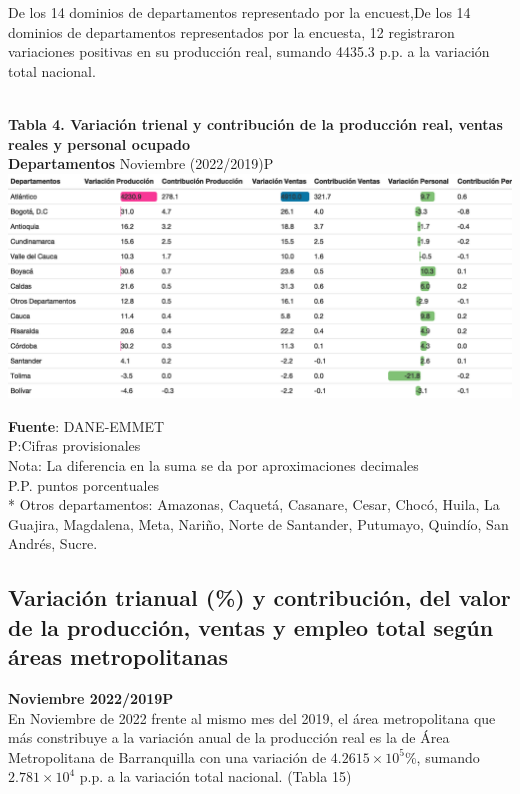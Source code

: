 \documentclass[
]{article}
\begin{document}
De los 14 dominios de departamentos representado por la encuest,De los
14 dominios de departamentos representados por la encuesta, 12
registraron variaciones positivas en su producción real, sumando 4435.3
p.p. a la variación total nacional.\\
\strut \\
\textbf{Tabla 4. Variación trienal y contribución de la producción real, ventas reales y personal ocupado}\\
\textbf{Departamentos} Noviembre (2022/2019)P\\

\includegraphics{boletin_files/figure-latex/tabla14_view-1.png}

\textbf{Fuente}: DANE-EMMET\\
P:Cifras provisionales\\
Nota: La diferencia en la suma se da por aproximaciones decimales\\
P.P. puntos porcentuales\\
* Otros departamentos: Amazonas, Caquetá, Casanare, Cesar, Chocó, Huila,
La Guajira, Magdalena, Meta, Nariño, Norte de Santander, Putumayo,
Quindío, San Andrés, Sucre.\\

\hypertarget{variaciuxf3n-trianual-y-contribuciuxf3n-del-valor-de-la-producciuxf3n-ventas-y-empleo-total-seguxfan-uxe1reas-metropolitanas}{%
\subsection{Variación trianual (\%) y contribución, del valor de la
producción, ventas y empleo total según áreas
metropolitanas}\label{variaciuxf3n-trianual-y-contribuciuxf3n-del-valor-de-la-producciuxf3n-ventas-y-empleo-total-seguxfan-uxe1reas-metropolitanas}}

\textbf{Noviembre 2022/2019P}\\

En Noviembre de 2022 frente al mismo mes del 2019, el área metropolitana
que más constribuye a la variación anual de la producción real es la de
Área Metropolitana de Barranquilla con una variación de
\ensuremath{4.2615\times 10^{5}}\%, sumando
\ensuremath{2.781\times 10^{4}} p.p. a la variación total nacional.
(Tabla 15)\\
\strut \\
\end{document}
